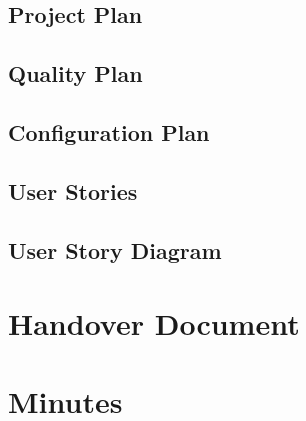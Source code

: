 \section{Project Plan}




\section{Quality Plan}


\section{Configuration Plan}


\section{User Stories}




\section{User Story Diagram}



\chapter{Handover Document}


\chapter{Minutes}
